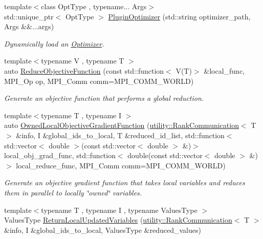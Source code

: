 \begin{DoxyCompactItemize}
\item 
{\footnotesize template$<$class Opt\-Type , typename... Args$>$ }\\std\-::unique\-\_\-ptr$<$ Opt\-Type $>$ \hyperlink{namespaceop_ab89cc7875ce491e652d0f1695dff260a}{Plugin\-Optimizer} (std\-::string optimizer\-\_\-path, Args \&\&...args)
\begin{DoxyCompactList}\small\item\em Dynamically load an \hyperlink{classop_1_1Optimizer}{Optimizer}. \end{DoxyCompactList}\item 
{\footnotesize template$<$typename V , typename T $>$ }\\auto \hyperlink{namespaceop_a35dd3e7e7547d532563befed8abc24f3}{Reduce\-Objective\-Function} (const std\-::function$<$ V(T)$>$ \&local\-\_\-func, M\-P\-I\-\_\-\-Op op, M\-P\-I\-\_\-\-Comm comm=M\-P\-I\-\_\-\-C\-O\-M\-M\-\_\-\-W\-O\-R\-L\-D)
\begin{DoxyCompactList}\small\item\em Generate an objective function that performs a global reduction. \end{DoxyCompactList}\item 
{\footnotesize template$<$typename T , typename I $>$ }\\auto \hyperlink{namespaceop_a7f687e290c734e1e5c558ba63cff2094}{Owned\-Local\-Objective\-Gradient\-Function} (\hyperlink{structop_1_1utility_1_1RankCommunication}{utility\-::\-Rank\-Communication}$<$ T $>$ \&info, I \&global\-\_\-ids\-\_\-to\-\_\-local, T \&reduced\-\_\-id\-\_\-list, std\-::function$<$ std\-::vector$<$ double $>$(const std\-::vector$<$ double $>$ \&)$>$ local\-\_\-obj\-\_\-grad\-\_\-func, std\-::function$<$ double(const std\-::vector$<$ double $>$ \&)$>$ local\-\_\-reduce\-\_\-func, M\-P\-I\-\_\-\-Comm comm=M\-P\-I\-\_\-\-C\-O\-M\-M\-\_\-\-W\-O\-R\-L\-D)
\begin{DoxyCompactList}\small\item\em Generate an objective gradient function that takes local variables and reduces them in parallel to locally \char`\"{}owned\char`\"{} variables. \end{DoxyCompactList}\item 
{\footnotesize template$<$typename T , typename I , typename Values\-Type $>$ }\\Values\-Type \hyperlink{namespaceop_a01f11125bcdfac5c2983ac310857a179}{Return\-Local\-Updated\-Variables} (\hyperlink{structop_1_1utility_1_1RankCommunication}{utility\-::\-Rank\-Communication}$<$ T $>$ \&info, I \&global\-\_\-ids\-\_\-to\-\_\-local, Values\-Type \&reduced\-\_\-values)

\end{DoxyCompactItemize}
